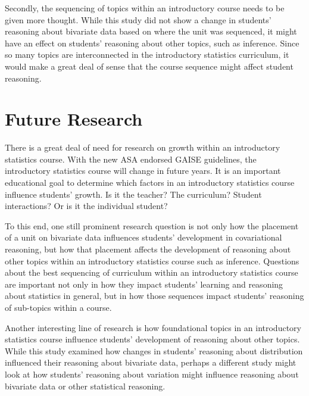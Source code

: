 \documentclass[11pt]{umnthesis}
\begin{document}
Secondly, the sequencing of topics within an introductory course needs to be given more thought. While this study did not show a change in students' reasoning about bivariate data based on where the unit was sequenced, it might have an effect on students' reasoning about other topics, such as inference. Since so many topics are interconnected in the introductory statistics curriculum, it would make a great deal of sense that the course sequence might affect student reasoning.

\hypertarget{future-research}{%
\section{Future Research}\label{future-research}}

There is a great deal of need for research on growth within an introductory statistics course. With the new ASA endorsed GAISE guidelines, the introductory statistics course will change in future years. It is an important educational goal to determine which factors in an introductory statistics course influence students' growth. Is it the teacher? The curriculum? Student interactions? Or is it the individual student?

To this end, one still prominent research question is not only how the placement of a unit on bivariate data influences students' development in covariational reasoning, but how that placement affects the development of reasoning about other topics within an introductory statistics course such as inference. Questions about the best sequencing of curriculum within an introductory statistics course are important not only in how they impact students' learning and reasoning about statistics in general, but in how those sequences impact students' reasoning of sub-topics within a course.

Another interesting line of research is how foundational topics in an introductory statistics course influence students' development of reasoning about other topics. While this study examined how changes in students' reasoning about distribution influenced their reasoning about bivariate data, perhaps a different study might look at how students' reasoning about variation might influence reasoning about bivariate data or other statistical reasoning.
\end{document}
